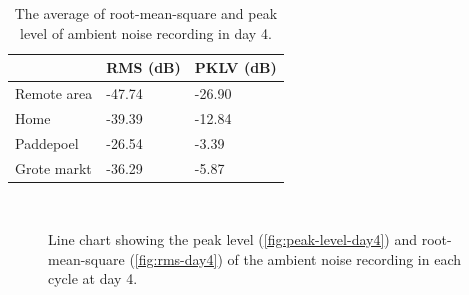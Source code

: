 	\begin{table}[H]
	\centering
	\caption{The average of root-mean-square and peak level of ambient noise recording in day 4.}
	\label{tab:ambient-noise-average-day4}
	\begin{tabular}{lll}
	\toprule
	            & \ac{RMS} (dB) & \ac{PKLV} (dB) \\ \midrule
	Remote area &  -47.74           &  -26.90    \\
	Home        &  -39.39         & -12.84       \\
	Paddepoel   & -26.54          &  -3.39       \\
	Grote markt & -36.29             & -5.87     \\ \bottomrule
	\end{tabular}
	\end{table}

	\begin{figure}[H]
		\\
		\caption{Line chart showing the peak level (\ref{fig:peak-level-day4}) and root-mean-square (\ref{fig:rms-day4}) of the ambient noise recording in each cycle at day 4.}
	\label{fig:audio-result-day4}
	\end{figure}

